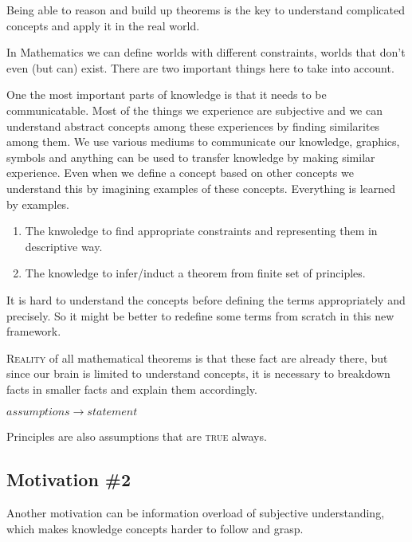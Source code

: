 \documentclass{article}
\begin{document}
Being able to reason and build up theorems is the key to understand complicated concepts and apply it in the real world. 

In Mathematics we can define worlds with different constraints, worlds that don't even (but can) exist. There are two important things here to take into account. 


One the most important parts of knowledge is that it needs to be communicatable. Most of the things we experience are subjective and we can understand abstract concepts among these experiences by finding similarites among them. We use various mediums to communicate our knowledge, graphics, symbols and anything can be used to transfer knowledge by making similar experience. Even when we define a concept based on other concepts we understand this by imagining examples of these concepts. Everything is learned by examples.

\begin{enumerate}
\item The knwoledge to find appropriate constraints and representing them in descriptive way.
\item The knowledge to infer/induct a theorem from finite set of principles.
\end{enumerate}


It is hard to understand the concepts before defining the terms appropriately and precisely. So it might be better to redefine some terms from scratch in this new framework.


\textsc{Reality} of all mathematical theorems is that these fact are already there, but since our brain is limited to understand concepts, it is necessary to breakdown facts in smaller facts and explain them accordingly.



\begin{center}\(assumptions \rightarrow statement\)\end{center}

Principles are also assumptions that are \textsc{true} always.



\subsection{Motivation \#2} 

Another motivation can be information overload of subjective understanding, which makes knowledge concepts harder to follow and grasp.
\end{document}
